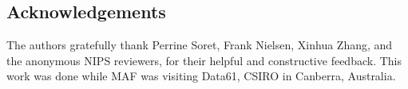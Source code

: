 \documentclass{article}
\begin{document}
\subsection*{Acknowledgements}

The authors gratefully thank Perrine Soret,
Frank Nielsen, Xinhua Zhang, and the anonymous NIPS reviewers,
for their helpful and constructive feedback.
This work was done while MAF was visiting Data61, CSIRO in Canberra, Australia.



\newpage\appendix
\end{document}
